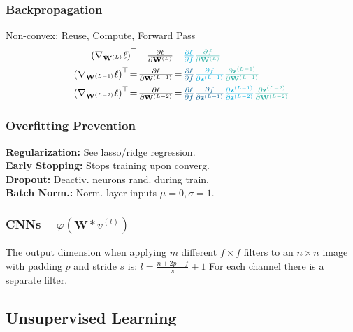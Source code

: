 \documentclass[a4paper,11pt]{article}
\begin{document}
\subsubsection*{Backpropagation} 
Non-convex; \textcolor{pri}{Reuse}, \textcolor{tri}{Compute}, \textcolor{sec}{Forward Pass}
$$
\begin{aligned}
\left(\nabla_{\mathbf{W}^{(L)}} \ell\right)^\top \textstyle  \!=\!  \frac{\partial \ell}{\partial \mathbf{W}^{(L)}} & \textstyle \!=\!  \textcolor{tri}{\frac{\partial \ell}{\partial f}}  \textcolor{sec}{\frac{\partial f}{\partial \mathbf{W}^{(L)}}} \\
\left(\nabla_{\mathbf{W}^{(L-1)}} \ell\right)^\top \textstyle  \!=\!  \frac{\partial \ell}{\partial \mathbf{W}^{(L-1)}} & \textstyle  \!=\!  \textcolor{pri}{\frac{\partial \ell}{\partial f}}  \textcolor{tri}{\frac{\partial f}{\partial \mathbf{z}^{(L-1)}}}  \textcolor{sec}{\frac{\partial \mathbf{z}^{(L-1)}}{\partial \mathbf{W}^{(L-1)}}} \\
\left(\nabla_{\mathbf{W}^{(L-2)}} \ell\right)^\top \textstyle  \!=\!  \frac{\partial \ell}{\partial \mathbf{W}^{(L-2)}} & \textstyle \!=\!  \textcolor{pri}{\frac{\partial \ell}{\partial f}}  \textcolor{pri}{\frac{\partial f}{\partial \mathbf{z}^{(L-1)}}}  \textcolor{tri}{\frac{\partial \mathbf{z}^{(L-1)}}{\partial \mathbf{z}^{(L-2)}}}  \textcolor{sec}{\frac{\partial \mathbf{z}^{(L-2)}}{\partial \mathbf{W}^{(L-2)}}}
\end{aligned}
$$

\subsubsection*{Overfitting Prevention}
\textbf{Regularization:} See lasso/ridge regression.\\
\textbf{Early Stopping:} Stops training upon converg.\\
\textbf{Dropout:} Deactiv. neurons rand. during train.\\
\textbf{Batch Norm.:} Norm. layer inputs $\mu\!=\!0, \sigma\!=\!1$. 

\subsubsection*{CNNs $\quad \varphi\left(\mathbf{W} * v^{(l)}\right)$} 
The output dimension when applying $m$ different $f \times f$ filters to an $n \times n$ image with padding $p$ and stride $s$ is: $l=\frac{n+2 p-f}{s}+1$ For each channel there is a separate filter. 
\subsection*{Unsupervised Learning} 
\end{document}
